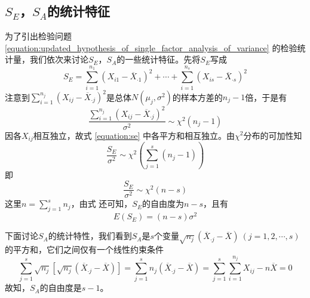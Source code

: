 \subsection{$ S_E $，$ S_A $的统计特征}

为了引出检验问题 \ref{equation:updated_hypothesis_of_single_factor_analysis_of_variance} 的检验统计量，我们依次来讨论$ S_E $，$ S_A $的一些统计特征。先将$ S_E $写成
\begin{equation}\label{equation:se}
	S_E = \sum_{i=1}^{n_1}\left( X_{i1} - \overline{X}_{\cdot 1}\right)^2 + \cdots + \sum_{i=1}^{n_s}\left( X_{is} - \overline{X}_{\cdot s}\right)^2
\end{equation}
注意到$ \displaystyle \sum_{i=1}^{n_j}\left( X_{ij} - \overline{X}_{\cdot j}\right) ^2 $是总体$ N\left( \mu_j, \sigma^2\right)  $的样本方差的$ n_j - 1 $倍，于是有
\begin{equation}
	\frac{\displaystyle \sum_{i=1}^{n_j}\left( X_{ij} - \overline{X}_{\cdot j}\right) ^2}{\sigma^2} \sim \chi^2\left( n_j -1\right) 
\end{equation}
因各$ X_{ij} $相互独立，故式 \ref{equation:se} 中各平方和相互独立。由$ \chi^2 $分布的可加性知
\begin{equation}
	\frac{S_E}{\sigma^2} \sim \chi^2\left( \sum_{j=1}^{s}\left( n_j - 1\right) \right) 
\end{equation}
即
\begin{equation}
	\frac{S_E}{\sigma^2} \sim \chi^2(n - s)
\end{equation}
这里$ \displaystyle n = \sum_{j=1}^{s}n_{j} $，由式 还可知，$ S_E $的自由度为$ n-s $，且有
\begin{equation}
	E(S_E) = (n - s)\sigma^2
\end{equation}

下面讨论$ S_A $的统计特性，我们看到$ S_A $是$ s $个变量$ \sqrt{n_j}(\overline{X}_{\cdot j} - \overline{X}) \ (j=1,2,\cdots,s) $的平方和，它们之间仅有一个线性约束条件
\begin{equation}
	\sum_{j=1}^{s}\sqrt{n_j}\left[\sqrt{n_j}(\overline{X}_{\cdot j} - \overline{X})\right] = \sum_{j=1}^{s}n_{j}(\overline{X}_{\cdot j} - \overline{X}) = \sum_{j=1}^{s}\sum_{i=1}^{n_j}X_{ij} - n\overline{X} = 0
\end{equation}
故知，$ S_A $的自由度是$ s-1 $。

